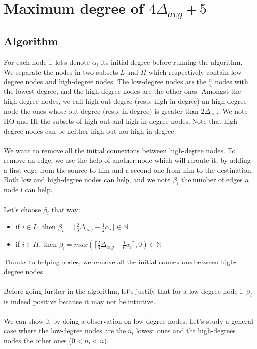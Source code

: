 \documentclass{article}
\begin{document}
\section{Maximum degree of $4\Delta_{avg} + 5$}

\subsection{Algorithm}

For each node i, let's denote $\alpha_i$ its initial degree before running
the algorithm.
We separate the nodes in two subsets $L$ and $H$ which respectively contain
low-degree nodes and high-degree nodes. The low-degree nodes are
the $\frac{n}{4}$ nodes with the lowest degree, and the high-degree nodes
are the other ones.
Amongst the high-degree nodes, we call high-out-degree (resp. high-in-degree)
an high-degree node the ones whose out-degree (resp. in-degree) is greater than
$2\Delta_{avg}$.
We note HO and HI the subsets of high-out and high-in-degree nodes.
Note that high-degree nodes can be neither high-out nor high-in-degree.\\\\
We want to remove all the initial connexions between high-degree nodes.
To remove an edge, we use the help of another node which will reroute
it, by adding a first edge from the source to him and a second
one from him to the destination.
Both low and high-degree nodes can help, and we note
$\beta_i$ the number of edges a node i can help.\\\\
Let's choose $\beta_i$ that way:
\begin{itemize}
  \item if $i \in L$, then
  $\beta_i = \lceil\frac{2}{3}\Delta_{avg}-\frac{1}{2}\alpha_i\rceil \in \mathbb{N}$
  \item if $i \in H$, then
  $\beta_i = max(\lceil\frac{2}{3}\Delta_{avg}-\frac{1}{6}\alpha_i\rceil, 0) \in \mathbb{N}$
\end{itemize}
Thanks to helping nodes, we remove all the initial connexions between high-degree nodes.\\\\
Before going further in the algorithm, let's justify that for a low-degree
node i, $\beta_i$ is indeed positive because it may not be intuitive.\\\\
We can show it by doing a observation on low-degree nodes.
Let's study a general case where the low-degree nodes are the
$n_l$ lowest ones and the high-degrees nodes the other ones ($0 < n_l < n$).
\end{document}
